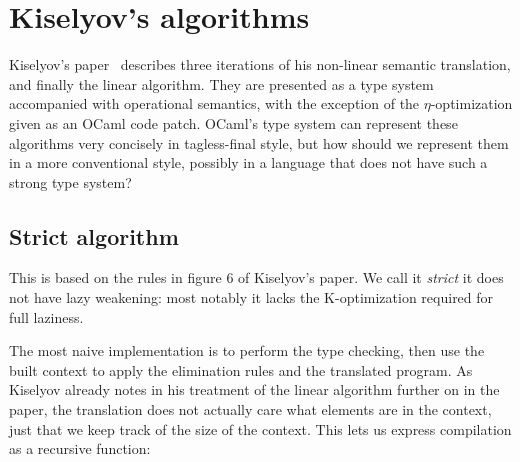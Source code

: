 \documentclass[conference]{IEEEtran}
\begin{document}
\section{Kiselyov's algorithms}
\label{sec:kiselyov}
Kiselyov's paper~\cite{kiselyov_lambda_2018} describes three iterations of his non-linear semantic translation, and finally the linear algorithm.
They are presented as a type system accompanied with operational semantics, with the exception of the $\eta$-optimization given as an OCaml code patch.
OCaml's type system can represent these algorithms very concisely in tagless-final style, but how should we represent them in a more conventional style, possibly in a language that does not have such a strong type system?

\subsection{Strict algorithm}
This is based on the rules in figure 6 of Kiselyov's paper.
We call it \textit{strict} it does not have lazy weakening: most notably it lacks the K-optimization required for full laziness.

The most naive implementation is to perform the type checking, then use the built context to apply the elimination rules and the translated program.
As Kiselyov already notes in his treatment of the linear algorithm further on in the paper, the translation does not actually care what elements are in the context, just that we keep track of the size of the context.
This lets us express compilation as a recursive function:
\end{document}
